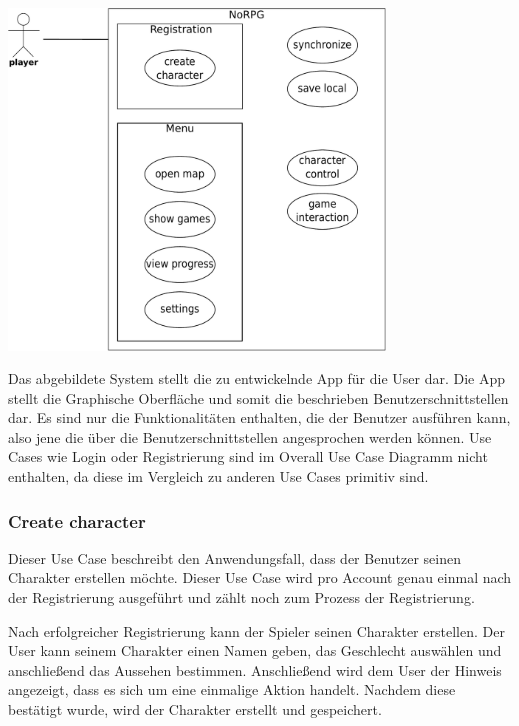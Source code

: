 		\begin{center}
			\includegraphics[width=10cm]{pics/OUCD.pdf}
		\end{center}
		
		Das abgebildete System stellt die zu entwickelnde App für die User dar. Die App stellt die Graphische Oberfläche und somit die beschrieben Benutzerschnittstellen dar. Es sind nur die Funktionalitäten enthalten, die der Benutzer ausführen kann, also jene die über die Benutzerschnittstellen angesprochen werden können. Use Cases wie Login oder Registrierung sind im Overall Use Case Diagramm nicht enthalten, da diese im Vergleich zu anderen Use Cases primitiv sind. 
	
		\subsubsection{Create character}
			Dieser Use Case beschreibt den Anwendungsfall, dass der Benutzer seinen Charakter erstellen möchte. Dieser Use Case wird pro Account genau einmal nach der Registrierung ausgeführt und zählt noch zum Prozess der Registrierung.
			
			Nach erfolgreicher Registrierung kann der Spieler seinen Charakter erstellen. Der User kann seinem Charakter einen Namen geben, das Geschlecht auswählen und anschließend das Aussehen bestimmen. Anschließend wird dem User der Hinweis angezeigt, dass es sich um eine einmalige Aktion handelt. Nachdem diese bestätigt wurde, wird der Charakter erstellt und gespeichert.
				
